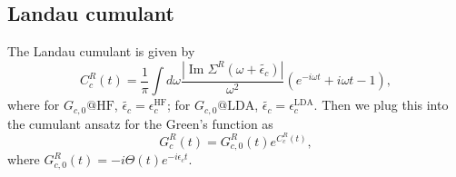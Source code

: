 \subsection{Landau cumulant}
The Landau cumulant is given by
\begin{equation}
    C_c^R(t) = \frac{1}{\pi}\int d\omega \frac{|\operatorname{Im} \Sigma^R(\omega+\tilde{\epsilon_c})|}{\omega^2} \left( e^{-i\omega t} + i\omega t - 1 \right),
\end{equation}
where for $G_{c,0}@\mathrm{HF}$, $\tilde{\epsilon_c} = \epsilon_c^{\mathrm{HF}}$; for $G_{c,0}@\mathrm{LDA}$, $\tilde{\epsilon_c} = \epsilon_c^{\mathrm{LDA}}$. Then we plug this into the cumulant ansatz for the Green's function as 
\begin{equation}
    G^R_c(t) = G_{c,0}^R(t) e^{C_c^R(t)},
\end{equation}
where $G_{c,0}^R(t) = -i \Theta(t) e^{-i\epsilon_c t}$.
